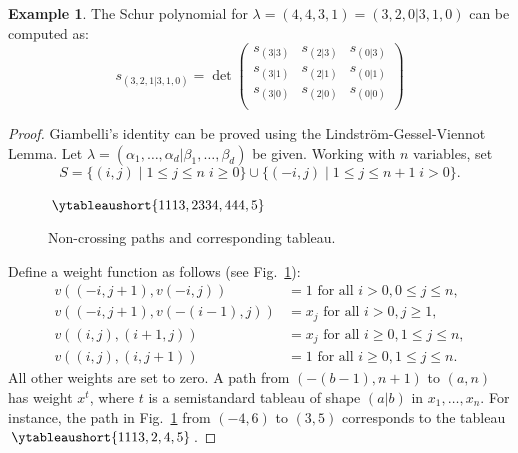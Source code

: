 \documentclass[11pt]{amsproc}
\theoremstyle{definition}
\theoremstyle{example}
\newtheorem{example}[theorem]{Example}
\begin{document}
\begin{example}
  The Schur polynomial for $\lambda=(4,4,3,1)=(3,2,0|3,1,0)$ can be computed as:
  \begin{displaymath}
    s_{(3,2,1|3,1,0)} = \det
    \begin{pmatrix}
      s_{(3|3)} & s_{(2|3)} & s_{(0|3)}\\
      s_{(3|1)} & s_{(2|1)} & s_{(0|1)}\\
      s_{(3|0)} & s_{(2|0)} & s_{(0|0)}\\
    \end{pmatrix}
  \end{displaymath}
\end{example}
\begin{proof}
  Giambelli's identity can be proved using the Lindstr\"om-Gessel-Viennot Lemma.
  Let $\lambda=(\alpha_1,\dotsc,\alpha_d|\beta_1,\dotsc,\beta_d)$ be given.
  Working with $n$ variables, set
  \begin{displaymath}
    S = \{(i,j)\mid 1\leq j \leq n\; i\geq 0\} \cup \{(-i,j)\mid 1\leq j\leq n+1\; i>0\}.
  \end{displaymath}
  \begin{figure}[h]
    \centering
    \hspace{1cm}$\ytableaushort{1113,2334,444,5}$
    \caption{Non-crossing paths and corresponding tableau.}
    \label{fig:giambelli}
  \end{figure}
  Define a weight function as follows (see Fig.~\ref{fig:giambelli}):
  \begin{align*}
    v((-i,j+1), v(-i,j)) & = 1 \text{ for all } i> 0, 0 \leq j \leq n,\\
    v((-i,j+1), v(-(i-1),j)) & = x_j \text{ for all } i>0, j\geq 1,\\
    v((i,j), (i+1,j)) & = x_j \text{ for all } i\geq 0, 1\leq j\leq n,\\
    v((i,j),(i,j+1)) & = 1 \text{ for all } i\geq 0, 1\leq j \leq n.
  \end{align*}
  All other weights are set to zero.
  A path from $(-(b-1),n+1)$ to $(a,n)$ has weight $x^t$, where $t$ is a semistandard tableau of shape $(a|b)$ in $x_1,\dotsc,x_n$.
  For instance, the path in Fig.~\ref{fig:giambelli} from $(-4,6)$ to $(3,5)$ corresponds to the tableau $\ytableaushort{1113,2,4,5}$.


\end{proof}
\end{document}
